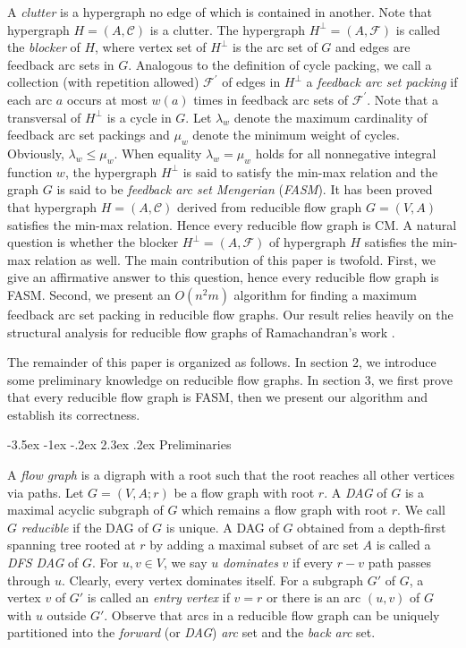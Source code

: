 \documentclass[11pt]{article}
\makeatletter
\renewcommand\section{%
  \@startsection{section}{1}
                {\z@}%
                {-3.5ex \@plus -1ex \@minus -.2ex}%
                {2.3ex \@plus.2ex}%
                {\large\bfseries}%
}
\makeatother
\begin{document}
A \emph{clutter} is a hypergraph no edge of which is contained in another. Note that hypergraph $H=(A,\mathcal{C})$ is a clutter. The hypergraph $H^\perp=(A,\mathcal{F})$ is called the \emph{blocker} of $H$, where vertex set of $H^\perp$ is the arc set of $G$ and edges are feedback arc sets in $G$. Analogous to the definition of cycle packing, we call a collection (with repetition allowed) $\mathcal{F}^\prime$ of edges in $H^\perp$ a \emph{feedback arc set packing} if each arc $a$ occurs at most $w(a)$ times in feedback arc sets of $\mathcal{F}^\prime$. Note that a transversal of $H^\perp$ is a cycle in $G$. Let $\lambda_w$ denote the maximum cardinality of feedback arc set packings and $\mu_w$ denote the minimum weight of cycles. Obviously, $\lambda_w\leq\mu_w$. When equality $\lambda_w=\mu_w$ holds for all nonnegative integral function $w$, the hypergraph $H^\perp$ is said to satisfy the min-max relation and the graph $G$ is said to be \emph{feedback arc set Mengerian} (\emph{FASM}). It has been proved that hypergraph $H=(A,\mathcal{C})$ derived from reducible flow graph $G=(V,A)$ satisfies the min-max relation. Hence every reducible flow graph is CM. A natural question is whether the blocker $H^\perp=(A,\mathcal{F})$ of hypergraph $H$ satisfies the min-max relation as well. The main contribution of this paper is twofold. First, we give an affirmative answer to this question, hence every reducible flow graph is FASM. Second, we present an $O(n^2 m)$ algorithm for finding a maximum feedback arc set packing in reducible flow graphs. Our result relies heavily on the structural analysis for reducible flow graphs of Ramachandran's work \cite{Rama1,Rama2}.

The remainder of this paper is organized as follows. In section 2, we introduce some preliminary knowledge on reducible flow graphs. In section 3, we first prove that every reducible flow graph is FASM, then we present our algorithm and establish its correctness.

\section{Preliminaries}
\label{prel}

A \emph{flow graph} is a digraph with a root such that the root reaches all other vertices via paths.
Let $G=(V,A;r)$ be a flow graph with root $r$. 
A \emph{DAG} of $G$ is a maximal acyclic subgraph of $G$ which remains a flow graph with root $r$. We call $G$ \emph{reducible} if the DAG of $G$ is unique. A DAG of $G$ obtained from a depth-first spanning tree rooted at $r$ by adding a maximal subset of arc set $A$ is called a \emph{DFS DAG} of $G$.
For $u,v\in V$, we say $u$ \emph{dominates} $v$ if every $r-v$ path passes through $u$. Clearly, every vertex dominates itself. For a subgraph $G'$ of $G$, a vertex $v$ of $G'$ is called an \emph{entry vertex} if $v=r$ or there is an arc $(u,v)$ of $G$ with $u$ outside $G'$.  Observe that arcs in a reducible flow graph can be uniquely partitioned into the \emph{forward} (or \emph{DAG}) \emph{arc} set and the \emph{back arc} set.
\end{document}
